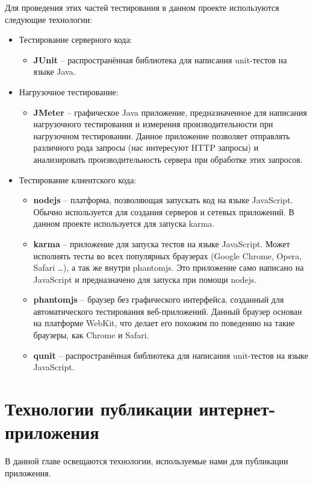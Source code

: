 	Для проведения этих частей тестирования в данном проекте используются следующие технологии:
	\begin{itemize}
\item Тестирование серверного кода:
	\begin{itemize}
		\item \textbf{JUnit} -- распространённая библиотека для написания unit-тестов на языке Java.
	\end{itemize}
\item Нагрузочное тестирование:
	\begin{itemize}
		\item \textbf{JMeter} -- графическое Java приложение, предназначенное для написания нагрузочного тестирования и измерения производительности при нагрузочном тестировании. Данное приложение позволяет отправлять различного рода запросы (нас интересуют HTTP запросы) и анализировать производительность сервера при обработке этих запросов.
	\end{itemize}
\item Тестирование клиентского кода:
\begin{itemize}
	\item \textbf{nodejs} -- платформа, позволяющая запускать код на языке Java\-Script. Обычно используется для создания серверов и сетевых приложений. В данном проекте используется для запуска karma.
	\item \textbf{karma} -- приложение для запуска тестов на языке JavaScript. Может исполнять тесты во всех популярных браузерах (Google Chro\-me, Opera, Safari \dots), а так же внутри phantomjs. Это приложение само написано на JavaScript и предназначено для запуска при помощи nodejs.
	\item \textbf{phantomjs} -- браузер без графического интерфейса, созданный для автоматического тестирования веб-приложений. Данный браузер основан на платформе WebKit, что делает его похожим по поведению на такие браузеры, как Chrome и Safari.
	\item \textbf{qunit} -- распространённая библиотека для написания unit-тестов на языке JavaScript.
\end{itemize}
\end{itemize}

\section{Технологии публикации интернет-прило\-же\-ния}
В данной главе освещаются технологии, используемые нами для публикации приложения.
